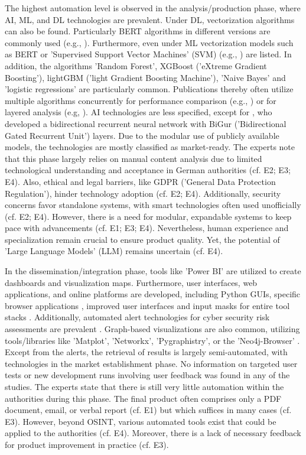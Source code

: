\documentclass[10pt]{article}
\begin{document}
The highest automation level is observed in the analysis/production phase, where AI, ML, and DL technologies are prevalent.
Under DL, vectorization algorithms can also be found. Particularly BERT algorithms in different versions are commonly used
(e.g., \cite{Ma.2022}). Furthermore, even under ML vectorization models such as BERT or
'Supervised Support Vector Machines' (SVM) (e.g., \cite{Iorga.2020}) are listed.
In addition, the algorithms 'Random Forest', XGBoost ('eXtreme Gradient Boosting'),
lightGBM ('light Gradient Boosting Machine'), 'Naive Bayes' and 'logistic regressions' are particularly common.
Publications thereby often utilize multiple algorithms concurrently for performance comparison (e.g., \cite{Tao.2023})
or for layered analysis (e.g, \cite{Yang.2022}). AI technologies are less specified,
except for \cite{Dale.2023}, who developed a bidirectional recurrent neural network with
BiGur ('Bidirectional Gated Recurrent Unit') layers. Due to the modular use of publicly available models,
the technologies are mostly classified as market-ready. The experts note that this phase largely relies
on manual content analysis due to limited technological understanding and acceptance in German authorities
(cf. E2; E3; E4). Also, ethical and legal barriers, like GDPR ('General Data Protection Regulation'), hinder technology
adoption (cf. E2; E4). Additionally, security concerns favor standalone systems,
with smart technologies often used unofficially (cf. E2; E4). However, there is a need for modular,
expandable systems to keep pace with advancements (cf. E1; E3; E4). Nevertheless, human experience
and specialization remain crucial to ensure product quality. Yet, the potential of 'Large Language Models' (LLM) remains uncertain (cf. E4).

In the dissemination/integration phase, tools like 'Power BI' \cite{Tao.2023}
are utilized to create dashboards and visualization maps. Furthermore, user interfaces,
web applications, and online platforms are developed, including Python GUIs,
specific browser applications \cite{Elmas.2022},
improved user interfaces and input masks for entire tool stacks \cite{Arjun.2020}.
Additionally, automated alert technologies for cyber security risk assessments are prevalent \cite{Ahuja.2022}. Graph-based visualizations are also common, utilizing tools/libraries like 'Matplot', 'Networkx', 'Pygraphistry', or the 'Neo4j-Browser' \cite{Middleton.2020}.
Except from the alerts, the retrieval of results is largely semi-automated, with technologies in the market establishment phase. No information on targeted user tests or new development runs involving user feedback was found in any of the studies. The experts state that there is still very little
automation within the authorities during this phase. The final product often comprises only a PDF document, email, or verbal report (cf. E1) but which suffices in many cases (cf. E3).
However, beyond OSINT, various automated tools exist that could be applied to the authorities (cf. E4). Moreover, there is a lack of necessary feedback for product improvement in practice (cf. E3).
\end{document}

